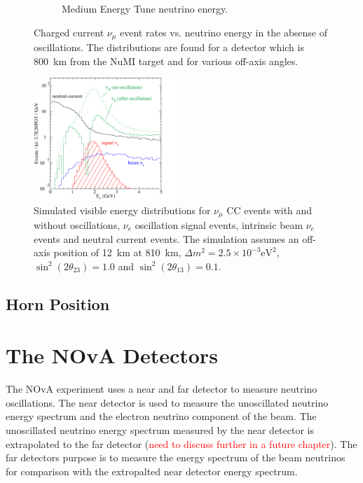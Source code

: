 \begin{figure}
\begin{subfigure}[b]{0.45\textwidth}
    \caption{Medium Energy Tune neutrino energy.}
    \label{fig:NuESpectra_MEAndLE_b}
  \end{subfigure}
  \caption{Charged current $\nu_{\mu}$ event rates vs. neutrino
    energy in the absense of oscillations. The distributions are found
  for a detector which is 800~km from the NuMI target and for various
  off-axis angles.}
  \label{fig:NuESpectra_MEAndLE}
\end{figure}


\begin{figure}
  \centering
  \includegraphics[width=0.5\textwidth]{../../img/beam/060-sig-and-bg-rates-thumb.png}
  \caption{Simulated visible energy distributions for $\nu_{\mu}$ CC
    events with and without oscillations, $\nu_e$ oscillation signal events,
    intrinsic beam $\nu_e$ events and neutral current events. The
    simulation assumes an off-axis position of 12~km at 810~km, $\Delta m^2 = 2.5 \times 10^{-3}
    \textrm{eV}^2$, $\sin^2(2\theta_{23}) = 1.0$ and
  $\sin^2(2\theta_{13}) = 0.1$.}
  \label{fig:NuMIBeamComp}
\end{figure}


\subsection{Horn Position}


\section{The NOvA Detectors}

The NOvA experiment uses a near and far detector to measure neutrino
oscillations. The near detector is used to measure the unoscillated
neutrino energy spectrum and the electron neutrino component of the
beam. The unoscillated neutrino energy spectrum measured by the near
detector is extrapolated to the far detector (\textcolor{red}{need to
  discuss further in a future chapter}). The far detectors purpose is
to measure the energy spectrum of the beam neutrinos for comparison
with the extropalted near detector energy spectrum.

